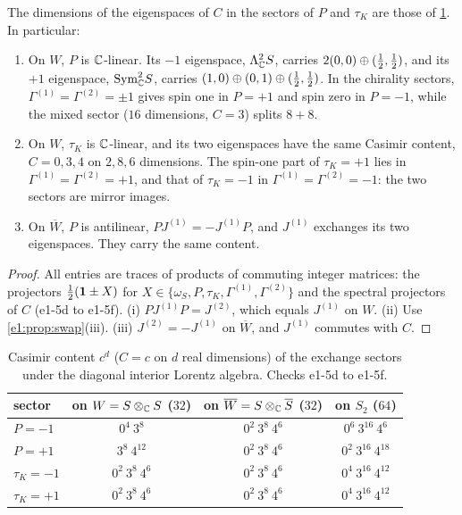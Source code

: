 \begin{proposition}
\label{e1:prop:stat}
The dimensions of the eigenspaces of $C$ in the sectors of $P$ and $\tau_K$ are those of \cref{e1:tab:stat}. In particular:
\begin{enumerate}[label=(\roman*),leftmargin=2.2em]
\item On $W$, $P$ is $\mathbb{C}$-linear. Its $-1$ eigenspace, $\Lambda^2_{\mathbb{C}} S$, carries $2(0,0)\oplus(\tfrac12,\tfrac12)$, and its $+1$ eigenspace, $\mathrm{Sym}^2_{\mathbb{C}} S$,
carries $(1,0)\oplus(0,1)\oplus(\tfrac12,\tfrac12)$. In the chirality sectors, $\Gamma^{(1)}=\Gamma^{(2)}=\pm1$ gives spin one in $P=+1$ and spin zero in
$P=-1$, while the mixed sector ($16$ dimensions, $C=3$) splits $8+8$.
\item On $W$, $\tau_K$ is $\mathbb{C}$-linear, and its two eigenspaces have the same Casimir content, $C=0,3,4$ on $2,8,6$ dimensions. The spin-one part of
$\tau_K=+1$ lies in $\Gamma^{(1)}=\Gamma^{(2)}=+1$, and that of $\tau_K=-1$ in $\Gamma^{(1)}=\Gamma^{(2)}=-1$: the two sectors are mirror images.
\item On $\overline W$, $P$ is antilinear, $PJ^{(1)}=-J^{(1)}P$, and $J^{(1)}$ exchanges its two eigenspaces. They carry the same content.
\end{enumerate}
\end{proposition}

\begin{proof}
All entries are traces of products of commuting integer matrices: the projectors $\tfrac12(\mathbf 1\pm X)$ for $X\in\{\omega_S,P,\tau_K,\Gamma^{(1)},\Gamma^{(2)}\}$ and
the spectral projectors of $C$ (e1-5d to e1-5f). (i) $PJ^{(1)}P=J^{(2)}$, which equals $J^{(1)}$ on $W$. (ii) Use \cref{e1:prop:swap}(iii). (iii)
$J^{(2)}=-J^{(1)}$ on $\overline W$, and $J^{(1)}$ commutes with $C$.
\end{proof}

\begin{table}[t]
\centering
\small
\begin{tabular}{@{}lccc@{}}
\toprule
sector & on $W=S\otimes_{\mathbb{C}} S$ ($32$) & on $\overline W=S\otimes_{\mathbb{C}}\overline S$ ($32$) & on $S_2$ ($64$)\\
\midrule
$P=-1$ & $0^4\ 3^8$ & $0^2\ 3^8\ 4^6$ & $0^6\ 3^{16}\ 4^6$\\
$P=+1$ & $3^8\ 4^{12}$ & $0^2\ 3^8\ 4^6$ & $0^2\ 3^{16}\ 4^{18}$\\
$\tau_K=-1$ & $0^2\ 3^8\ 4^6$ & $0^2\ 3^8\ 4^6$ & $0^4\ 3^{16}\ 4^{12}$\\
$\tau_K=+1$ & $0^2\ 3^8\ 4^6$ & $0^2\ 3^8\ 4^6$ & $0^4\ 3^{16}\ 4^{12}$\\
\bottomrule
\end{tabular}
\caption{Casimir content $c^d$ ($C=c$ on $d$ real dimensions) of the exchange sectors under the diagonal interior Lorentz algebra.
Checks e1-5d to e1-5f.}
\label{e1:tab:stat}
\end{table}

